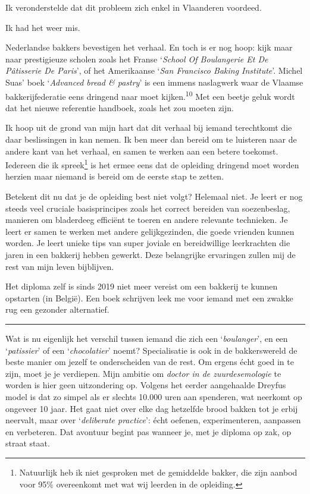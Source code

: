 \documentclass[
  11pt,
  dutch,
]{memoir}
\begin{document}
Ik veronderstelde dat dit probleem zich enkel in Vlaanderen voordeed.

Ik had het weer mis.

Nederlandse bakkers bevestigen het verhaal. En toch is er nog hoop: kijk
maar naar prestigieuze scholen zoals het Franse `\emph{School Of
Boulangerie Et De Pâtisserie De Paris}', of het Amerikaanse `\emph{San
Francisco Baking Institute}'. Michel Suas' boek `\emph{Advanced bread \&
pastry}' is een immens naslagwerk waar de Vlaamse bakkerijfederatie eens
dringend naar moet kijken.\textsuperscript{10} Met een beetje geluk
wordt dat het nieuwe referentie handboek, zoals het zou moeten zijn.

Ik hoop uit de grond van mijn hart dat dit verhaal bij iemand
terechtkomt die daar beslissingen in kan nemen. Ik ben meer dan bereid
om te luisteren naar de andere kant van het verhaal, en samen te werken
aan een betere toekomst. Iedereen die ik spreek\footnote{Natuurlijk heb
  ik niet gesproken met de gemiddelde bakker, die zijn aanbod voor 95\%
  overeenkomt met wat wij leerden in de opleiding.} is het ermee eens
dat de opleiding dringend moet worden herzien maar niemand is bereid om
de eerste stap te zetten.

Betekent dit nu dat je de opleiding best niet volgt? Helemaal niet. Je
leert er nog steeds veel cruciale basisprincipes zoals het correct
bereiden van soezenbeslag, manieren om bladerdeeg efficiënt te toeren en
andere relevante technieken. Je leert er samen te werken met andere
gelijkgezinden, die goede vrienden kunnen worden. Je leert unieke tips
van super joviale en bereidwillige leerkrachten die jaren in een
bakkerij hebben gewerkt. Deze belangrijke ervaringen zullen mij de rest
van mijn leven bijblijven.

Het diploma zelf is sinds 2019 niet meer vereist om een bakkerij te
kunnen opstarten (in België). Een boek schrijven leek me voor iemand met
een zwakke rug een gezonder alternatief.

\pfbreak

Wat is nu eigenlijk het verschil tussen iemand die zich een
`\emph{boulanger}', en een `\emph{patissier}' of een
`\emph{chocolatier}' noemt? Specialisatie is ook in de bakkerswereld de
beste manier om jezelf te onderscheiden van de rest. Om ergens écht goed
in te zijn, moet je je verdiepen. Mijn ambitie om \emph{doctor in de
zuurdesemologie} te worden is hier geen uitzondering op. Volgens het
eerder aangehaalde Dreyfus model is dat zo simpel als er slechts 10.000
uren aan spenderen, wat neerkomt op ongeveer 10 jaar. Het gaat niet over
elke dag hetzelfde brood bakken tot je erbij neervalt, maar over
`\emph{deliberate practice}': écht oefenen, experimenteren, aanpassen en
verbeteren. Dat avontuur begint pas wanneer je, met je diploma op zak,
op straat staat.
\end{document}
